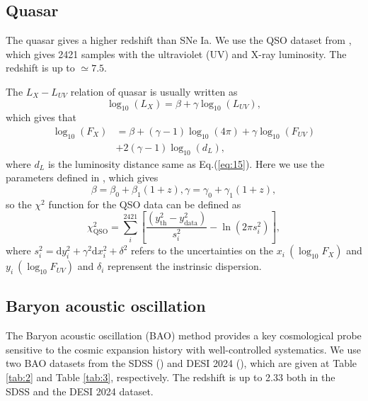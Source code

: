 \documentclass[twocolumn]{aastex631}
\begin{document}
\subsection{Quasar}

   The quasar gives a higher redshift than SNe Ia.
   We use the QSO dataset from \cite{Lusso_2020}, which gives
   2421 samples with the ultraviolet (UV) and X-ray luminosity.
   The redshift is up to $\simeq7.5$.

   The $L_X-L_{UV}$ relation of quasar is usually written as
   \begin{equation}
      \log_{10}(L_X)=\beta+\gamma\log_{10}(L_{UV}),
   \end{equation}
   which gives that
   \begin{eqnarray}
      \nonumber\log_{10}(F_X)&=\beta+(\gamma-1)\log_{10}(4\pi)+\gamma\log_{10}(F_{UV})
                    \\ &+2(\gamma-1)\log_{10}(d_L),
   \end{eqnarray}
   where $d_L$ is the luminosity distance same as Eq.(\ref{eq:15}).
   Here we use the parameters defined in \cite{li2024redshiftevolutionxrayuv}, which
   gives\begin{equation}
      \beta=\beta_0+\beta_1(1+z),\gamma=\gamma_0+\gamma_1(1+z),
   \end{equation}
   so the $\chi^2$ function for the QSO data can be defined as
   \begin{equation}
      \chi_{\text{QSO}}^2=\sum_i^{2421}\left[\frac{(y_{\text{th}}^2-y_{\text{data}}^2)}{s_i^2}
      -\ln(2\pi s_i^2)\right],
   \end{equation}
   where $s_i^2=\mathrm{d}y_i^2+\gamma^2\mathrm{d}x_i^2+\delta^2$ refers to the 
   uncertainties on the $x_i\ (\log_{10}F_X)$ and $y_i\ (\log_{10}F_{UV})$ and
   $\delta_i$ reprensent the instrinsic dispersion.

\subsection{Baryon acoustic oscillation}

   The Baryon acoustic oscillation (BAO) method provides a key cosmological probe
   sensitive to the cosmic expansion history with well-controlled systematics.
   We use two BAO datasets from the SDSS (\cite{PhysRevD.103.083533}) and DESI 2024 (\cite{desicollaboration2024desi2024vicosmological}),
   which are given at Table \ref{tab:2} and Table \ref{tab:3}, respectively.
   The redshift is up to 2.33 both in the SDSS and the DESI 2024 dataset.
\end{document}

